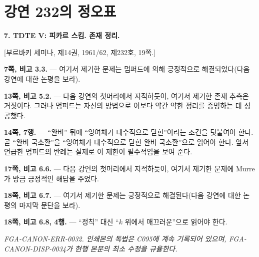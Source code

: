 \clearpage
\chapter*{강연 232의 정오표}
\setcounter{footnote}{9}

\noindent\textbf{7. TDTE V: 피카르 스킴. 존재 정리.}

\begin{center}
[부르바키 세미나, 제14권, 1961/62, 제232호, 19쪽.]
\end{center}

\noindent\textbf{7쪽, 비고 3.3.} --- 여기서 제기한 문제는 멈퍼드에
의해 긍정적으로 해결되었다(다음 강연에 대한 논평을 보라).

\noindent\textbf{13쪽, 비고 5.2.} --- 다음 강연의 첫머리에서
지적하듯이, 여기서 제기한 존재 추측은 거짓이다. 그러나 멈퍼드는 자신의
방법으로 이보다 약간 약한 정리를 증명하는 데 성공했다.

\noindent\textbf{14쪽, 7행.} --- ``완비'' 뒤에 ``잉여체가 대수적으로
닫힌''이라는 조건을 덧붙여야 한다. 곧 ``완비 국소환''을 ``잉여체가
대수적으로 닫힌 완비 국소환''으로 읽어야 한다. 앞서 언급한 멈퍼드의
반례는 실제로 이 제한이 필수적임을 보여 준다.

\noindent\textbf{17쪽, 비고 6.6.} --- 다음 강연의 첫머리에서
지적하듯이, 여기서 제기한 문제에 Murre가 방금 긍정적인 해답을 주었다.

\noindent\textbf{18쪽, 비고 6.7.} --- 여기서 제기한 문제는
긍정적으로 해결된다(다음 강연에 대한 논평의 마지막 문단을 보라).

\noindent\textbf{18쪽, 비고 6.8, 4행.} --- ``정칙'' 대신
``$k$ 위에서 매끄러운''으로 읽어야 한다.

\par\smallskip
\begingroup\footnotesize
\noindent\textit{FGA-CANON-ERR-0032. 인쇄본의 독법은 C095에 계속 기록되어 있으며, FGA-CANON-DISP-0034가 현행 본문의 최소 수정을 규율한다.}\par
\endgroup
